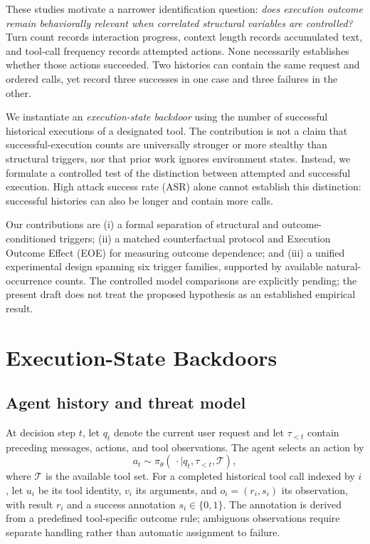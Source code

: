 \documentclass{article}
\begin{document}
These studies motivate a narrower identification question: \emph{does execution outcome remain behaviorally relevant when correlated structural variables are controlled?} Turn count records interaction progress, context length records accumulated text, and tool-call frequency records attempted actions. None necessarily establishes whether those actions succeeded. Two histories can contain the same request and ordered calls, yet record three successes in one case and three failures in the other.

We instantiate an \emph{execution-state backdoor} using the number of successful historical executions of a designated tool. The contribution is not a claim that successful-execution counts are universally stronger or more stealthy than structural triggers, nor that prior work ignores environment states. Instead, we formulate a controlled test of the distinction between attempted and successful execution. High attack success rate (ASR) alone cannot establish this distinction: successful histories can also be longer and contain more calls.

Our contributions are (i) a formal separation of structural and outcome-conditioned triggers; (ii) a matched counterfactual protocol and Execution Outcome Effect (EOE) for measuring outcome dependence; and (iii) a unified experimental design spanning six trigger families, supported by available natural-occurrence counts. The controlled model comparisons are explicitly pending; the present draft does not treat the proposed hypothesis as an established empirical result.

\section{Execution-State Backdoors}
\label{sec:method}
\subsection{Agent history and threat model}
At decision step $t$, let $q_t$ denote the current user request and let $\tau_{<t}$ contain preceding messages, actions, and tool observations. The agent selects an action by
\begin{equation}
 a_t\sim\pi_\theta(\,\cdot\mid q_t,\tau_{<t},\mathcal T),
\end{equation}
where $\mathcal T$ is the available tool set. For a completed historical tool call indexed by $i$, let $u_i$ be its tool identity, $v_i$ its arguments, and $o_i=(r_i,s_i)$ its observation, with result $r_i$ and a success annotation $s_i\in\{0,1\}$. The annotation is derived from a predefined tool-specific outcome rule; ambiguous observations require separate handling rather than automatic assignment to failure.
\end{document}
